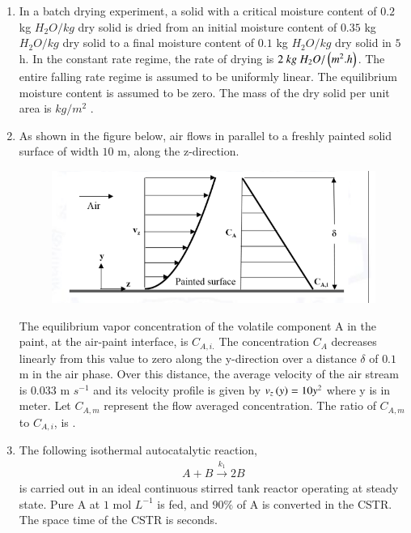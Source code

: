 \documentclass[journal,12pt,onecolumn]{IEEEtran}
\theoremstyle{remark}
\begin{document}
\begin{enumerate}
\item In a batch drying experiment, a solid with a critical moisture content of $0.2$ kg $H_{2}O/kg$ dry solid is dried from an initial moisture content of $0.35$ kg $H_{2}O/kg$ dry solid to a final moisture content of $0.1$ kg $H_{2}O/kg$ dry solid in $5$ h. In the constant rate regime, the rate of drying is $2~kg~H_{2}O/\left(m^{2}.h\right)$. The entire falling rate regime is assumed to be uniformly linear. The equilibrium moisture content is assumed to be zero. The mass of the dry solid per unit area is \underline{\hspace{2cm}} $kg/m^{2}$ .
\hfill{}

 

\item As shown in the figure below, air flows in parallel to a freshly painted solid surface of width $10$ m, along the z-direction.
\begin{figure}[H]
\centering
\includegraphics[width = 0.5\columnwidth]{q48.png}
\caption*{}
\label{fig:q48}
\end{figure}
The equilibrium vapor concentration of the volatile component A in the paint, at the air-paint interface, is $C_{A,i.}$ The concentration $C_{A}$ decreases linearly from this value to zero along the y-direction over a distance $\delta$ of $0.1$ m in the air phase. Over this distance, the average velocity of the air stream is $0.033$ m $s^{-1}$ and its velocity profile  is given by $v_{z}\left(y\right)=10y^{2}$ where y is in meter. Let $C_{A,m}$ represent the flow averaged concentration. The ratio of $C_{A,m}$ to $C_{A,i}$, is \underline{\hspace{2cm}} .
\hfill{}

 

\item The following isothermal autocatalytic reaction,
\begin{align*}
A+B \xrightarrow{k_{1}} 2B
\end{align*}
is carried out in an ideal continuous stirred tank reactor  operating at steady state. Pure A at $1$ mol $L^{-1}$ is fed, and $90\%$ of A is converted in the CSTR. The space time of the CSTR is \underline{\hspace{2cm}} seconds.
\hfill{}


\end{enumerate}
\end{document}
